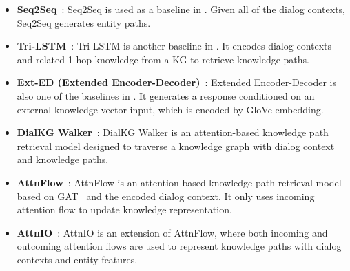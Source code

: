 \begin{itemize}
    \item \textbf{Seq2Seq}~\cite{sutskever2014sequence}: Seq2Seq is used as a baseline in \cite{moon2019opendialkg,tuan2022towards}. Given all of the dialog contexts, Seq2Seq generates entity paths.
    \item \textbf{Tri-LSTM}~\cite{young2017augmenting}: Tri-LSTM is another baseline in \cite{moon2019opendialkg,tuan2022towards}. It encodes dialog contexts and related 1-hop knowledge from a KG to retrieve knowledge paths. 
    \item \textbf{Ext-ED (Extended Encoder-Decoder)}~\cite{parthasarathi2018extending}: Extended Encoder-Decoder is also one of the baselines in \cite{moon2019opendialkg,tuan2022towards}. 
    It generates a response conditioned on an external knowledge vector input, which is encoded by GloVe embedding.
    \item \textbf{DialKG Walker}~\cite{moon2019opendialkg}: DialKG Walker is an attention-based knowledge path retrieval model designed to traverse a knowledge graph with dialog context and knowledge paths.
    \item \textbf{AttnFlow}~\cite{jung2020attnio}: AttnFlow is an attention-based knowledge path retrieval model based on GAT~\cite{velivckovic2018graph} and the encoded dialog context.
    It only uses incoming attention flow to update knowledge representation.
    \item \textbf{AttnIO}~\cite{jung2020attnio}: AttnIO is an extension of AttnFlow, where both incoming and outcoming attention flows are used to represent knowledge paths with dialog contexts and entity features.
\end{itemize}

